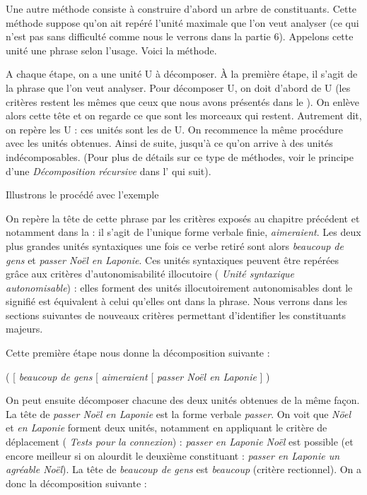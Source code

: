 Une autre méthode consiste à construire d’abord un arbre de constituants. Cette méthode suppose qu’on ait repéré l’unité maximale que l’on veut analyser (ce qui n'est pas sans difficulté comme nous le verrons dans la partie 6). Appelons cette unité une phrase selon l’usage. Voici la méthode.

A chaque étape, on a une unité U à décomposer. À la première étape, il s’agit de la phrase que l’on veut analyser. Pour décomposer U, on doit d’abord  de U (les critères restent les mêmes que ceux que nous avons présentés dans le ). On enlève alors cette tête et on regarde ce que sont les morceaux qui restent. Autrement dit, on repère les   U : ces unités sont les  de U. On recommence la même procédure avec les unités obtenues. Ainsi de suite, jusqu’à ce qu’on arrive à des unités indécomposables. (Pour plus de détails sur ce type de méthodes, voir le principe d’une \textit{Décomposition récursive} dans l’ qui suit).

Illustrons le procédé avec l’exemple 

On repère la tête de cette phrase par les critères exposés au chapitre précédent et notamment dans la  : il s’agit de l’unique forme verbale finie, \textit{aimeraient}. Les deux plus grandes unités syntaxiques une fois ce verbe retiré sont alors \textit{beaucoup de gens} et \textit{passer Noël en Laponie}. Ces unités syntaxiques peuvent être repérées grâce aux critères d’autonomisabilité illocutoire ( \textit{Unité syntaxique autonomisable}) : elles forment des unités illocutoirement autonomisables dont le signifié est équivalent à celui qu’elles ont dans la phrase. Nous verrons dans les sections suivantes de nouveaux critères permettant d’identifier les constituants majeurs.

Cette première étape nous donne la décomposition suivante :

\ea
   ( [ \textit{beaucoup de gens} [ \textit{aimeraient} [ \textit{passer Noël en Laponie} ] )
\z

On peut ensuite décomposer chacune des deux unités obtenues de la même façon. La tête de \textit{passer Noël en Laponie} est la forme verbale \textit{passer}. On voit que \textit{Nöel} et \textit{en Laponie} forment deux unités, notamment en appliquant le critère de déplacement ( \textit{Tests pour la connexion}) : \textit{passer en Laponie Noël} est possible (et encore meilleur si on alourdit le deuxième constituant : \textit{passer en Laponie un agréable Noël}). La tête de \textit{beaucoup de gens} est \textit{beaucoup} (critère rectionnel). On a donc la décomposition suivante :

